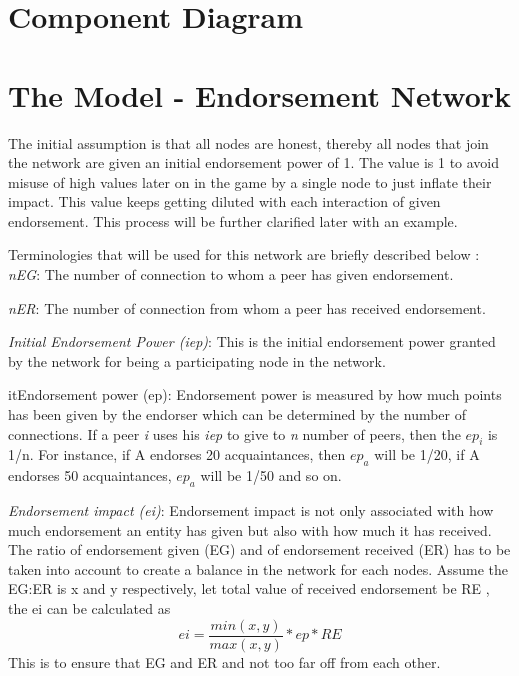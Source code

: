 \section{Component Diagram}



\section{The Model - Endorsement Network}
The initial assumption is that all nodes are honest, thereby all nodes that join 
the network are given an initial endorsement power of 1. The value is 1 to avoid 
misuse of high values later on in the game by a single node to just inflate their 
impact. This value keeps getting diluted with each interaction of given  
endorsement. This process will be further clarified later with an example.

Terminologies that will be used for this network are briefly described below : \\
\textit{nEG}: The number of connection to whom a peer has given endorsement.

\textit{nER}: The number of connection from whom a peer has received endorsement. 


\textit{Initial Endorsement Power (iep)}: This is the initial endorsement power 
granted by the network for being a participating node in the network. 

\tex
it{Endorsement power (ep):} Endorsement power is measured by how much points 
has been given by the endorser which can be determined by the number of 
connections. If a peer \textit{i} uses his \textit{iep} to give to \textit{n} 
number of peers, then the $ep_i$ is 1/n. For instance, if A endorses 
20 acquaintances, then $ep_a$ will be 1/20, if A endorses 50 
acquaintances, $ep_a$ will be 1/50 and so on. 

\textit{Endorsement impact (ei)}: Endorsement impact is not only associated with 
how much endorsement an entity has given but also with how much it has received. 
The ratio of endorsement given (EG) and of endorsement received (ER) has to be 
taken into account to create a balance in the network for each nodes. Assume the 
EG:ER is x and y respectively, let total value of received endorsement be RE , 
the ei can be calculated as \\
\begin{equation}
	ei = \frac{min(x,y)}{max(x,y)} * ep * RE 
\end{equation}
This is to ensure that EG and ER and not too far off from each other. \\ 

